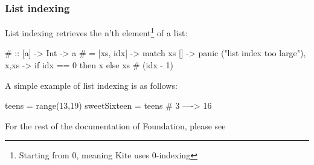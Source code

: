 \subsubsection{List indexing}

List indexing retrieves the n'th element\footnote{Starting from 0, meaning Kite uses 0-indexing} of a list:
\begin{kite}

{#} :: [a] -> Int -> a
{#} = |xs, idx| -> {
  match xs {
    [] -> panic ("list index too large"),
    x,xs -> if idx == 0 then x else xs # (idx - 1)
  }
}
\end{kite}


A simple example of list indexing is as follows:

\begin{kite}

teens = range(13,19)
sweetSixteen = teens # 3 ----> 16
\end{kite}



For the rest of the documentation of Foundation, please see 
